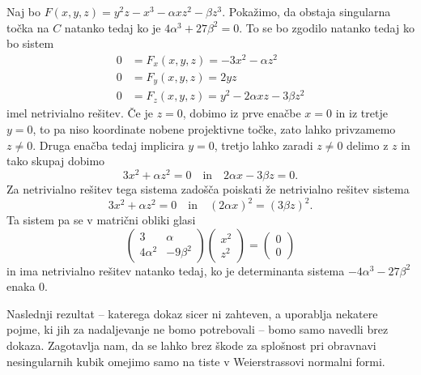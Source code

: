 \documentclass[mat1]{fmfdelo}
\theoremstyle{definition}
\begin{document}
\begin{dokaz}
    Naj bo $F(x,y,z) = y^2z - x^3 - \alpha xz^2 - \beta z^3$. Pokažimo, da obstaja singularna točka na $C$ natanko tedaj ko je $4\alpha^3 + 27\beta^2 = 0$. To se bo zgodilo natanko tedaj ko bo sistem
    \begin{align*}
        0 &= F_x(x,y,z) = -3x^2 - \alpha z^2\\
        0 &= F_y(x,y,z) = 2yz\\
        0 &= F_z(x,y,z) = y^2 - 2\alpha xz - 3 \beta z^2
    \end{align*}
    imel netrivialno rešitev. Če je $z = 0$, dobimo iz prve enačbe $x = 0$ in iz tretje $y = 0$, to pa niso koordinate nobene projektivne točke, zato lahko privzamemo $z \neq 0$. Druga enačba tedaj implicira $y = 0$, tretjo lahko zaradi $z \neq 0$ delimo z $z$ in tako skupaj dobimo
    \[
        3x^2 + \alpha z^2 = 0 \quad \text{in} \quad 2\alpha x - 3 \beta z = 0.   
    \]
    Za netrivialno rešitev tega sistema zadošča poiskati že netrivialno rešitev sistema
    \[
        3x^2 + \alpha z^2 = 0 \quad \text{in} \quad (2\alpha x)^2 = (3 \beta z)^2. 
    \]
    Ta sistem pa se v matrični obliki glasi
    \[
        \begin{pmatrix}
            3 & \alpha \\
            4\alpha^2 & -9\beta^2
        \end{pmatrix} 
        \begin{pmatrix}
            x^2 \\
            z^2
        \end{pmatrix}
        =
        \begin{pmatrix}
            0 \\
            0
        \end{pmatrix}
    \]
    in ima netrivialno rešitev natanko tedaj, ko je determinanta sistema $-4\alpha^3 - 27\beta^2$ enaka $0$. 
\end{dokaz}


Naslednji rezultat -- katerega dokaz sicer ni zahteven, a uporablja nekatere pojme, ki jih za nadaljevanje ne bomo potrebovali -- bomo samo navedli brez dokaza. Zagotavlja nam, da se lahko brez škode za splošnost pri obravnavi nesingularnih kubik omejimo samo na tiste v Weierstrassovi normalni formi. 


\end{document}
